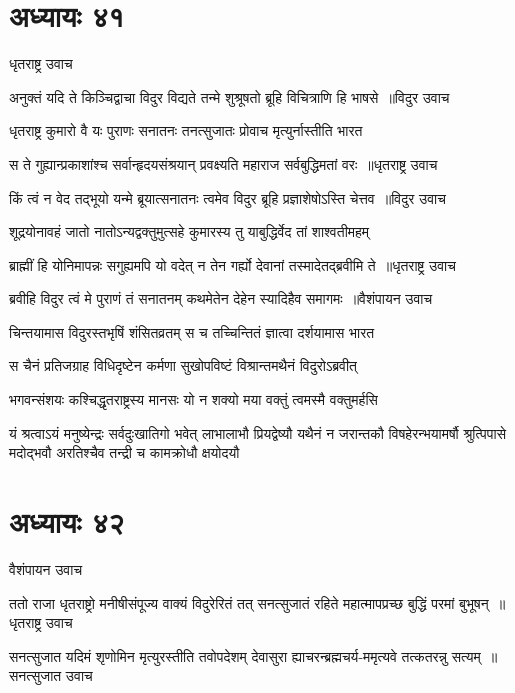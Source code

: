 \chapter{अध्यायः ४१}
\twolineshloka
{धृतराष्ट्र उवाच}
{}


\threelineshloka
{अनुक्तं यदि ते किञ्चिद्वाचा विदुर विद्यते}
{तन्मे शुश्रूषतो ब्रूहि विचित्राणि हि भाषसे ॥विदुर उवाच}
{}


\twolineshloka
{धृतराष्ट्र कुमारो वै यः पुराणः सनातनः}
{तनत्सुजातः प्रोवाच मृत्युर्नास्तीति भारत}


\threelineshloka
{स ते गुह्यान्प्रकाशांश्च सर्वान्हृदयसंश्रयान्}
{प्रवक्ष्यति महाराज सर्वबुद्धिमतां वरः ॥धृतराष्ट्र उवाच}
{}


\threelineshloka
{किं त्वं न वेद तद्भूयो यन्मे ब्रूयात्सनातनः}
{त्वमेव विदुर ब्रूहि प्रज्ञाशेषोऽस्ति चेत्तव ॥विदुर उवाच}
{}


\twolineshloka
{शूद्रयोनावहं जातो नातोऽन्यद्वक्तुमुत्सहे}
{कुमारस्य तु याबुद्धिर्वेद तां शाश्वतीमहम्}


\threelineshloka
{ब्राह्मीं हि योनिमापन्नः सगुह्यमपि यो वदेत्}
{न तेन गर्ह्यो देवानां तस्मादेतद्ब्रवीमि ते ॥धृतराष्ट्र उवाच}
{}


\threelineshloka
{ब्रवीहि विदुर त्वं मे पुराणं तं सनातनम्}
{कथमेतेन देहेन स्यादिहैव समागमः ॥वैशंपायन उवाच}
{}


\twolineshloka
{चिन्तयामास विदुरस्तभृषिं शंसितव्रतम्}
{स च तच्चिन्तितं ज्ञात्वा दर्शयामास भारत}


\twolineshloka
{स चैनं प्रतिजग्राह विधिदृष्टेन कर्मणा}
{सुखोपविष्टं विश्रान्तमथैनं विदुरोऽब्रवीत्}


\twolineshloka
{भगवन्संशयः कश्चिद्धृतराष्ट्रस्य मानसः}
{यो न शक्यो मया वक्तुं त्वमस्मै वक्तुमर्हसि}


यं श्रत्वाऽयं मनुष्येन्द्रः सर्वदुःखातिगो भवेत्
\threelineshloka
{लाभालाभौ प्रियद्वेष्यौ यथैनं न जरान्तकौ}
{विषहेरन्भयामर्षौ श्रुत्पिपासे मदोद्भवौ}
{अरतिश्चैव तन्द्री च कामक्रोधौ क्षयोदयौ}


\chapter{अध्यायः ४२}
\twolineshloka
{वैशंपायन उवाच}
{}


\threelineshloka
{ततो राजा धृतराष्ट्रो मनीषीसंपूज्य वाक्यं विदुरेरितं तत्}
{सनत्सुजातं रहिते महात्मापप्रच्छ बुद्धिं परमां बुभूषन् ॥धृतराष्ट्र उवाच}
{}


\threelineshloka
{सनत्सुजात यदिमं शृणोमिन मृत्युरस्तीति तवोपदेशम्}
{देवासुरा ह्याचरन्ब्रह्मचर्य-ममृत्यवे तत्कतरन्नु सत्यम् ॥सनत्सुजात उवाच}
{}


